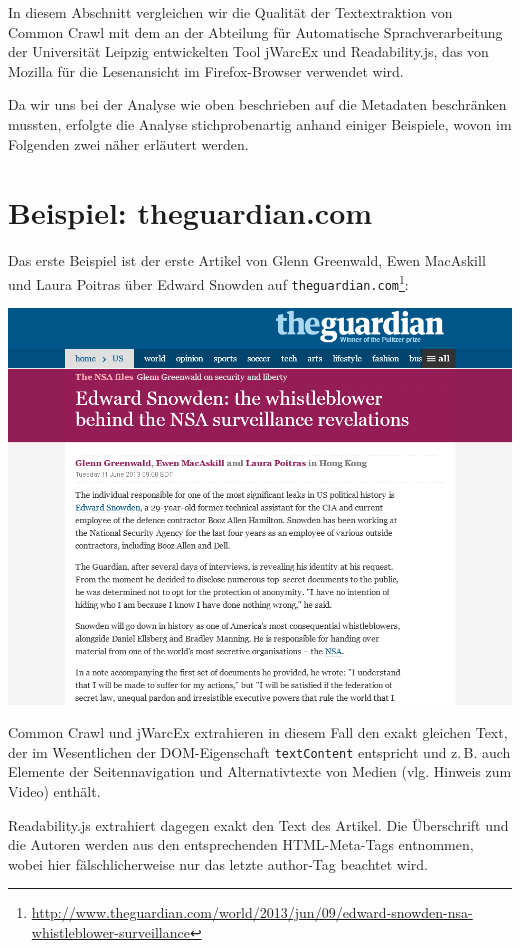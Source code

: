 \documentclass[a4paper,12pt,titlepage=false]{scrreprt}
\begin{document}
In diesem Abschnitt vergleichen wir die Qualität der Textextraktion von Common Crawl mit dem an der Abteilung für Automatische Sprachverarbeitung der Universität Leipzig entwickelten Tool jWarcEx und Readability.js, das von Mozilla für die Lesenansicht im Firefox-Browser verwendet wird.

Da wir uns bei der Analyse wie oben beschrieben auf die Metadaten beschränken mussten, erfolgte die Analyse stichprobenartig anhand einiger Beispiele, wovon im Folgenden zwei näher erläutert werden.

\section{Beispiel: theguardian.com}

Das erste Beispiel ist der erste Artikel von Glenn Greenwald, Ewen MacAskill und Laura Poitras über Edward Snowden auf \texttt{theguardian.com}\footnote{\url{http://www.theguardian.com/world/2013/jun/09/edward-snowden-nsa-whistleblower-surveillance}}:

\begin{center}
    \includegraphics[trim=0 130px 0 0, clip=true, width=.8\textwidth]{images/guardian-website}
\end{center}

\noindent
Common Crawl und jWarcEx extrahieren in diesem Fall den exakt gleichen Text, der im Wesentlichen der DOM-Eigenschaft \texttt{textContent} entspricht und z.\,B. auch Elemente der Seitennavigation und Alternativtexte von Medien (vlg. Hinweis zum Video) enthält.

Readability.js extrahiert dagegen exakt den Text des Artikel. Die Überschrift und die Autoren werden aus den entsprechenden HTML-Meta-Tags entnommen, wobei hier fälschlicherweise nur das letzte author-Tag beachtet wird.
\end{document}
